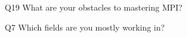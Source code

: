 \begin{description}%
\item{Q19} What are your obstacles to mastering MPI?%
\item{Q7} Which fields are you mostly working in?%
\end{description}%
